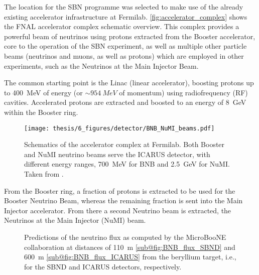 The location for the SBN programme was selected to make use of the already existing accelerator infrastructure at Fermilab. \autoref{fig:accelerator_complex} shows the FNAL accelerator complex schematic overview. This complex provides a powerful beam of neutrinos using protons extracted from the Booster accelerator, core to the operation of the SBN experiment, as well as multiple other particle beams (neutrinos and muons, as well as protons) which are employed in other experiments, such as the Neutrinos at the Main Injector Beam. 

The common starting point is the Linac (linear accelerator), boosting protons up to \SI{400}{MeV} of energy (or $\sim\SI{954}{MeV}$ of momentum) using radiofrequency (RF) cavities. Accelerated protons are extracted and boosted to an energy of \SI{8}{GeV} within the Booster ring. 

\begin{figure}
    \centering
    \texttt{[image: thesis/6\_figures/detector/BNB\_NuMI\_beams.pdf]}
    \caption[Fermilab Accelerator complex]{Schematics of the accelerator complex at Fermilab. Both Booster and NuMI neutrino beams serve the ICARUS detector, with different energy  ranges, \SI{700}{MeV} for BNB and \SI{2.5}{GeV} for NuMI. Taken from \cite{ainsworthHighIntensityOperation2020}.}
    \label{fig:accelerator_complex}
\end{figure}

From the Booster ring, a fraction of protons is extracted to be used for the Booster Neutrino Beam, whereas the remaining fraction is sent into the Main Injector accelerator. From there a second Neutrino beam is extracted, the Neutrinos at the Main Injector (NuMI) beam. 

\begin{figure}
    \centering

    \caption[BNB flux predictions at the near and far detectors]{Predictions of the neutrino flux as computed by the MicroBooNE collaboration \cite{miniboonecollaborationNeutrinoFluxPrediction2009} at distances of \SI{110}{m} \ref{sub@fig:BNB_flux_SBND} and \SI{600}{m} \ref{sub@fig:BNB_flux_ICARUS} from the beryllium target, i.e., for the SBND and ICARUS detectors, respectively. }
    \label{fig:BNB_flux}
\end{figure}

